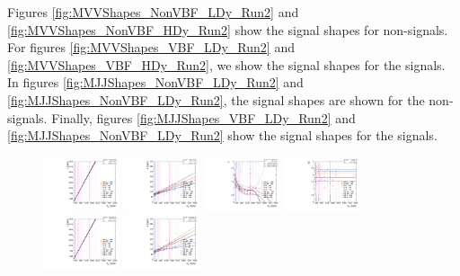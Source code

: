 Figures \ref{fig:MVVShapes_NonVBF_LDy_Run2} and \ref{fig:MVVShapes_NonVBF_HDy_Run2} show the \MVV signal shapes for non-\VBF signals.
For figures \ref{fig:MVVShapes_VBF_LDy_Run2} and \ref{fig:MVVShapes_VBF_HDy_Run2}, we show the \MVV signal shapes for the \VBF signals.
In figures \ref{fig:MJJShapes_NonVBF_LDy_Run2} and \ref{fig:MJJShapes_NonVBF_LDy_Run2}, the \MJ signal shapes are shown for the non-\VBF signals.
Finally, figures \ref{fig:MJJShapes_VBF_LDy_Run2} and \ref{fig:MJJShapes_NonVBF_LDy_Run2} show the \MJ signal shapes for the \VBF signals.

\begin{figure}[htbp]
  \centering
  \includegraphics[width=0.2\textwidth]{fig/analysis/paramSignalShape_allSig_MVV_HP_bb_DEtaLo_MEAN.pdf}
  \includegraphics[width=0.2\textwidth]{fig/analysis/paramSignalShape_allSig_MVV_HP_bb_DEtaLo_SIGMA.pdf}
  \includegraphics[width=0.2\textwidth]{fig/analysis/paramSignalShape_allSig_MVV_HP_bb_DEtaLo_ALPHA1.pdf}
  \includegraphics[width=0.2\textwidth]{fig/analysis/paramSignalShape_allSig_MVV_HP_bb_DEtaLo_ALPHA2.pdf}\\
  \includegraphics[width=0.2\textwidth]{fig/analysis/paramSignalShape_allSig_MVV_LP_bb_DEtaLo_MEAN.pdf}
  \includegraphics[width=0.2\textwidth]{fig/analysis/paramSignalShape_allSig_MVV_LP_bb_DEtaLo_SIGMA.pdf}

\end{figure}

